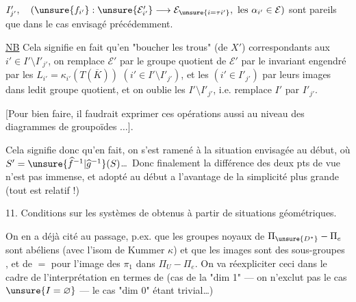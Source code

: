 
\(I'_{j'},\quad (\unsure{f_{i'}}:\unsure{\mathcal E'_{i'}}\longrightarrow
\mathcal E_{\unsure{i=\tau i'}},\ \text{les }\alpha_{i'}\in\mathcal E)\)
sont pareils que dans le cas envisagé précédemment.

\uline{NB} Cela signifie en fait qu'en  "boucher les trous" 
(de \(X'\)) correspondants aux \(i'\in I'\setminus I'_{j'}\), on remplace
\(\mathcal E'\) par le  groupe quotient de \(\mathcal E'\)
par le  invariant engendré par les
\(L_{i'}=\kappa_{i'}(T(\overline K))\)
\((i'\in I'\setminus I'_{j'})\), et les 
\((i'\in I'_{j'})\) par leurs images dans ledit groupe quotient, et on oublie
les \(I'\setminus I'_{j'}\), i.e. remplace \(I'\) par \(I'_{j'}\).

[Pour bien faire, il faudrait exprimer ces opérations aussi au niveau des diagrammes
de groupoïdes
\(\ldots\)].


Cela signifie donc qu'en fait, on s'est ramené à la situation envisagée au début,
où \(S'=\unsure{\widehat f^{-1}|\widehat g^{-1}}(S)\)\ldots\ Donc finalement
la différence des deux pts de vue n'est pas immense, et
 adopté au début a l'avantage de
la simplicité plus grande (tout est relatif !)



11. Conditions sur les systèmes de 
 obtenus à partir de situations géométriques.

On en a déjà cité au passage, p.ex. que les groupes noyaux de
\(\Pi_{\unsure{D^*}}-\Pi_e\) sont abéliens (avec l'isom de Kummer \(\kappa\))
et que les images sont des sous-groupes , et de \(=\) pour
l'image des  \(\pi_1\) dans \(\Pi_U-\Pi_e\).
On va réexpliciter  ceci dans le cadre de l'interprétation
en termes de
(cas de la "dim 1" --- on n'exclut pas le cas \(\unsure{I=\varnothing}\) ---
le cas "dim 0" étant trivial\ldots)


